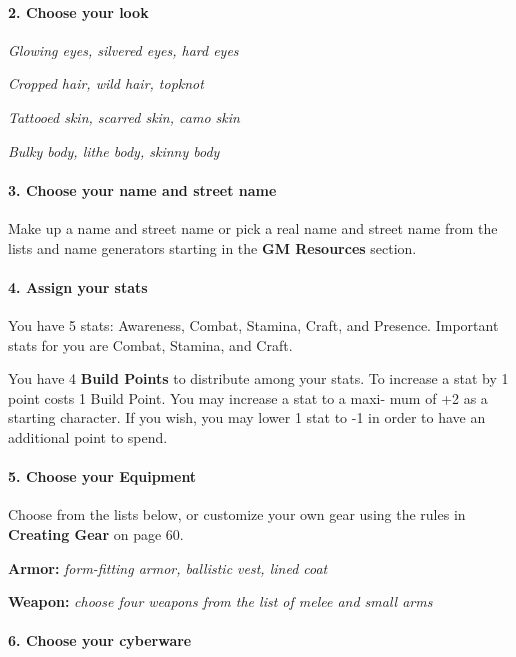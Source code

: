\begin{multicols}{3}
\paragraph{2.  Choose your look}

\textit{Glowing eyes, silvered eyes, hard eyes}

\textit{Cropped hair, wild hair, topknot}

\textit{Tattooed skin, scarred skin, camo skin}

\textit{Bulky body, lithe body, skinny body}

\paragraph{3.  Choose your name and street name}

Make up a name and street name or pick a real
name and street name from the lists and name
generators starting in the \textbf{GM Resources} section.

\paragraph{4.  Assign your stats}

You have 5 stats: Awareness, Combat, Stamina,
Craft, and Presence. Important stats for you are
Combat, Stamina, and Craft.


You have 4 \textbf{Build Points} to distribute among
your stats. To increase a stat by 1 point costs 1
Build Point. You may increase a stat to a maxi-
mum of +2 as a starting character. If you wish,
you may lower 1 stat to -1 in order to have an
additional point to spend.

\paragraph{5.  Choose your Equipment}

Choose from the lists below, or customize your
own gear using the rules in \textbf{Creating Gear} on
page 60.

\textbf{Armor:} \textit{form-fitting armor, ballistic vest, lined
coat}

\textbf{Weapon:} \textit{choose four weapons from the list
of melee and small arms}


\paragraph{6.  Choose your cyberware}


\end{multicols}
